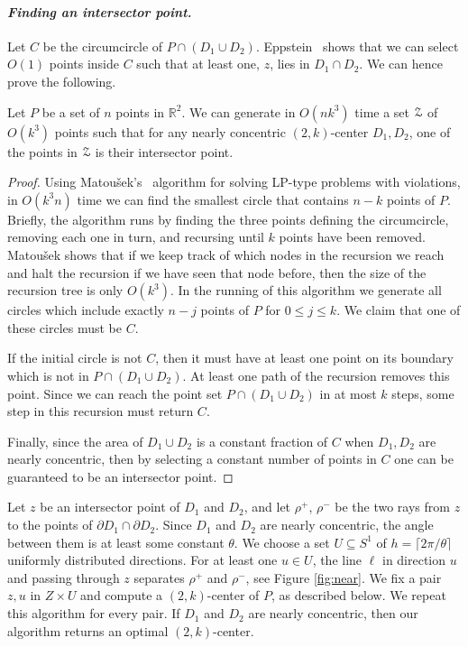 \documentclass[11pt]{myclass}
\renewcommand{\b}[1]{\ensuremath{\mathbb{#1}}}
\newcommand{\EuZ}{\ensuremath{\EuScript{Z}}}
\begin{document}
\paragraph{\textbf{\emph{Finding an intersector point.}}}
Let $C$ be the circumcircle of $P \cap (D_1 \cup D_2)$.
Eppstein~\cite{Epp97} shows that we can select $O(1)$ points inside $C$ such that at least one, $z$, lies in $D_1 \cap D_2$.  
We can hence prove the following.

\begin{lemma}
Let $P$ be a set of $n$ points in $\b{R}^2$.  We can generate in $O(nk^3)$ time a set $\EuZ$ of $O(k^3)$ points such that for any nearly concentric $(2,k)$-center $D_1, D_2$, one of the points in $\EuZ$ is their intersector point.  
\end{lemma}

\begin{proof}
Using Matou\v{s}ek's~\cite{Mat95} algorithm for solving LP-type problems with violations, in $O(k^3 n)$ time we can find the smallest circle that contains $n-k$ points of $P$.  
Briefly, the algorithm runs by finding the three points defining the circumcircle, removing each one in turn, and recursing until $k$ points have been removed.  Matou\v{s}ek shows that if we keep track of which nodes in the recursion we reach and halt the recursion if we have seen that node before, then the size of the recursion tree is only $O(k^3)$.  
In the running of this algorithm we generate all circles which include exactly $n-j$ points of $P$ for $0 \leq j \leq k$.  We claim that one of these circles must be $C$. 

If the initial circle is not $C$, then it must have at least one point on its 
boundary which is not in $P \cap (D_1 \cup D_2)$.  At least one path of the recursion removes this point.  Since we can reach the point set $P \cap (D_1 \cup D_2)$ in at most $k$ steps, some step in this recursion must return $C$.  


Finally, since the area of $D_1 \cup D_2$ is a constant fraction of $C$ when $D_1, D_2$ are nearly concentric, then by selecting a constant number of points in $C$ one can be guaranteed to be an intersector point. 
\end{proof}




Let $z$ be an intersector point of $D_1$ and $D_2$, and let $\rho^+$, $\rho^-$ be the two rays from $z$  to the points of $\partial D_1 \cap \partial D_2$.  
Since $D_1$ and $D_2$ are nearly concentric, the angle between them is at least some constant $\theta$.  We choose a set $U \subseteq S^1$ of $h = \lceil 2 \pi / \theta \rceil$ uniformly distributed directions.  For at least one $u \in U$, the line $\ell$ in direction $u$ and passing through $z$ separates $\rho^+$ and $\rho^-$, see Figure \ref{fig:near}.  We fix a pair $z,u$ in $Z \times U$ and compute a $(2,k)$-center of $P$, as described below.  We repeat this algorithm for every pair.  If $D_1$ and $D_2$ are nearly concentric, then our algorithm returns an optimal $(2,k)$-center.  
\end{document}
